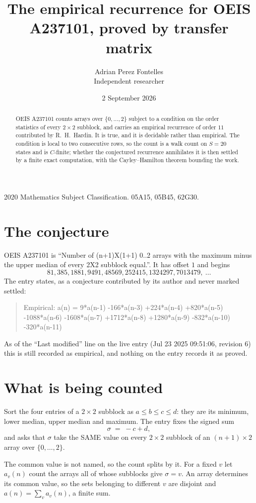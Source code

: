 \documentclass[11pt,a4paper]{article}
\title{The empirical recurrence for OEIS A237101, proved by transfer matrix}
\author{Adrian Perez Fontelles\\ \small Independent researcher}
\date{2 September 2026}
\theoremstyle{plain}
\theoremstyle{definition}
\begin{document}
\maketitle

\begin{abstract}
OEIS A237101 counts arrays over $\{0,\dots,2\}$ subject to a condition on the order
statistics of every $2\times2$ subblock, and carries an empirical recurrence of order
$11$ contributed by R.~H.~Hardin. It is true, and it is decidable rather than empirical.
The condition is local to two consecutive rows, so the count is a walk count on $S=20$
states and is $C$-finite; whether the conjectured recurrence annihilates it is then settled by
a finite exact computation, with the Cayley--Hamilton theorem bounding the work.
\end{abstract}

\noindent\small 2020 Mathematics Subject Classification. 05A15, 05B45, 62G30.\normalsize

\section{The conjecture}

OEIS A237101 is ``Number of (n+1)X(1+1) 0..2 arrays with the maximum minus the upper median of every 2X2 subblock equal.''. It has offset $1$ and begins
\[
81, 385, 1881, 9491, 48569, 252415, 1324297, 7013479,\ \dots
\]
The entry states, as a conjecture contributed by its author and never marked settled:
\begin{quote}
Empirical: a(n) = 9*a(n-1) -166*a(n-3) +224*a(n-4) +820*a(n-5) -1088*a(n-6) -1608*a(n-7) +1712*a(n-8) +1280*a(n-9) -832*a(n-10) -320*a(n-11)
\end{quote}
As of the ``Last modified'' line on the live entry (Jul 23 2025 09:51:06, revision 6) this is still
recorded as empirical, and nothing on the entry records it as proved.

\section{What is being counted}

Sort the four entries of a $2\times2$ subblock as $a\le b\le c\le d$: they
are its minimum, lower median, upper median and maximum. The entry fixes the signed sum
\[
\sigma\;=\;-c+d,
\]
and asks that $\sigma$ take the SAME value on every $2\times2$ subblock of an
$(n+1)\times2$ array over $\{0,\dots,2\}$.

The common value is not named, so the count splits by it. For a fixed $v$ let $a_v(n)$ count
the arrays all of whose subblocks give $\sigma=v$. An array determines its common value, so
the sets belonging to different $v$ are disjoint and $a(n)=\sum_v a_v(n)$, a finite sum.
\end{document}
